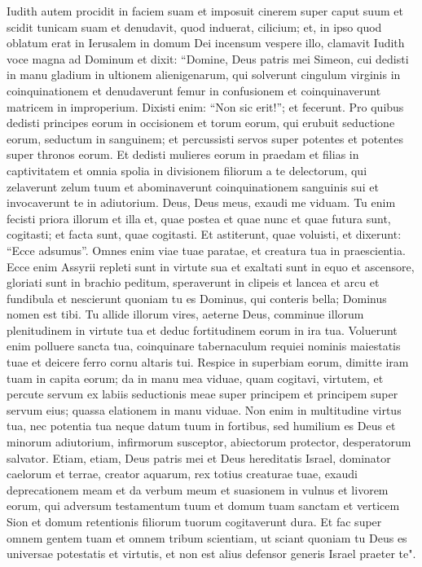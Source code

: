 \begin{biblechapter}  
\verse Iudith autem procidit in faciem suam et imposuit cinerem super caput suum et scidit tunicam suam et denudavit, quod induerat, cilicium; et, in ipso quod oblatum erat in Ierusalem in domum Dei incensum vespere illo, clamavit Iudith voce magna ad Dominum et dixit: 
\verse “Domine, Deus patris mei Simeon, cui dedisti in manu gladium in ultionem alienigenarum, qui solverunt cingulum virginis in coinquinationem et denudaverunt femur in confusionem et coinquinaverunt matricem in improperium. Dixisti enim: “Non sic erit!”; et fecerunt. 
\verse Pro quibus dedisti principes eorum in occisionem et torum eorum, qui erubuit seductione eorum, seductum in sanguinem; et percussisti servos super potentes et potentes super thronos eorum. 
\verse Et dedisti mulieres eorum in praedam et filias in captivitatem et omnia spolia in divisionem filiorum a te delectorum, qui zelaverunt zelum tuum et abominaverunt coinquinationem sanguinis sui et invocaverunt te in adiutorium. Deus, Deus meus, exaudi me viduam. 
\verse Tu enim fecisti priora illorum et illa et, quae postea et quae nunc et quae futura sunt, cogitasti; et facta sunt, quae cogitasti. 
\verse Et astiterunt, quae voluisti, et dixerunt: “Ecce adsumus”. Omnes enim viae tuae paratae, et creatura tua in praescientia. 
\verse Ecce enim Assyrii repleti sunt in virtute sua et exaltati sunt in equo et ascensore, gloriati sunt in brachio peditum, speraverunt in clipeis et lancea et arcu et fundibula et nescierunt quoniam tu es Dominus, qui conteris bella; 
\verse Dominus nomen est tibi. Tu allide illorum vires, aeterne Deus, comminue illorum plenitudinem in virtute tua et deduc fortitudinem eorum in ira tua. Voluerunt enim polluere sancta tua, coinquinare tabernaculum requiei nominis maiestatis tuae et deicere ferro cornu altaris tui. 
\verse Respice in superbiam eorum, dimitte iram tuam in capita eorum; da in manu mea viduae, quam cogitavi, virtutem, 
\verse et percute servum ex labiis seductionis meae super principem et principem super servum eius; quassa elationem in manu viduae. 
\verse Non enim in multitudine virtus tua, nec potentia tua neque datum tuum in fortibus, sed humilium es Deus et minorum adiutorium, infirmorum susceptor, abiectorum protector, desperatorum salvator. 
\verse Etiam, etiam, Deus patris mei et Deus hereditatis Israel, dominator caelorum et terrae, creator aquarum, rex totius creaturae tuae, exaudi deprecationem meam 
\verse et da verbum meum et suasionem in vulnus et livorem eorum, qui adversum testamentum tuum et domum tuam sanctam et verticem Sion et domum retentionis filiorum tuorum cogitaverunt dura. 
\verse Et fac super omnem gentem tuam et omnem tribum scientiam, ut sciant quoniam tu Deus es universae potestatis et virtutis, et non est alius defensor generis Israel praeter te". 
\end{biblechapter}

